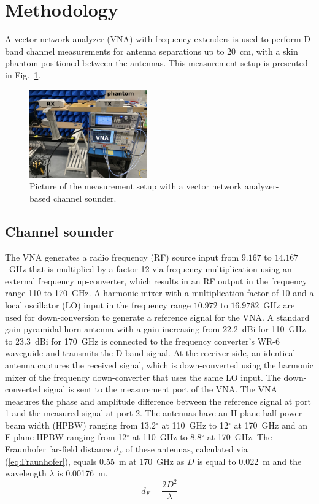 \documentclass[preprint]{rsl}
\begin{document}
\section{Methodology \label{sect:method}}

A vector network analyzer (VNA) with frequency extenders is used to perform D-band channel measurements for antenna separations up to 20~cm, with a skin phantom positioned between the antennas. 
This measurement setup is presented in Fig.~\ref{fig:sounder_setup}.
\begin{figure}[tb]
\begin{center}
	\includegraphics[width=0.45\textwidth]{figures/measurement_setup}
\caption{Picture of the measurement setup with a vector network analyzer-based channel sounder.}
\label{fig:sounder_setup}
\end{center}
\end{figure}

\subsection{Channel sounder}

The VNA generates a radio frequency (RF) source input from $9.167$ to $14.167$~GHz that is multiplied by a factor 12 via frequency multiplication using an external frequency up-converter, which results in an RF output in the frequency range 110 to 170~GHz. 
A harmonic mixer with a multiplication factor of 10 and a local oscillator (LO) input in the frequency range $10.972$ to $16.9782$~GHz are used for down-conversion to generate a reference signal for the VNA. 
A standard gain pyramidal horn antenna with a gain increasing from 22.2~dBi for 110~GHz  to 23.3~dBi for 170~GHz is connected to the frequency converter's WR-6 waveguide and transmits the D-band signal.
At the receiver side, an identical antenna captures the received signal, which is down-converted using the harmonic mixer of the frequency down-converter that uses the same LO input. 
The down-converted signal is sent to the measurement port of the VNA. 
The VNA measures the phase and amplitude difference between the reference signal at port 1 and the measured signal at port 2.
The antennas have an H-plane half power beam width (HPBW) ranging from 13.2$^{\circ}$ at 110~GHz to 12$^{\circ}$ at 170~GHz and an E-plane HPBW ranging from 12$^{\circ}$ at 110~GHz to 8.8$^{\circ}$ at 170~GHz. 
The Fraunhofer far-field distance $d_F$ of these antennas, calculated via (\ref{eq:Fraunhofer}), equals 0.55~m at 170~GHz as $D$ is equal to 0.022~m and the wavelength $\lambda$ is 0.00176~m.
\begin{equation}
\label{eq:Fraunhofer}
d_F = \frac{2 D^2}{\lambda}
\end{equation}
\end{document}
